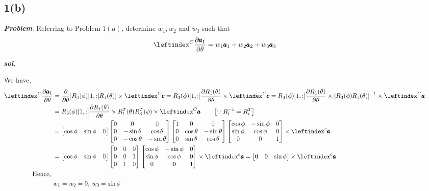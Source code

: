 \subsection{1(b)}
\textbf{\textit{Problem}}: Referring to Problem $1(a)$, determine $w_1, w_2$ and  $w_3$ such that
$$ \lx{^C}{\frac{\partial \pmb a_1}{\partial \theta}} = w_1 \pmb a_1 + w_2 \pmb a_2 + w_3 \pmb a_3$$

\textbf{\textit{sol.}}

We have,
\begin{align*}
    \lx{^C}{\frac{\partial \pmb a_1}{\partial \theta}}  &=
    \frac{\partial}{\partial \theta} [R_3(\phi)[1,:]R_1(\theta)] \times \lx{^C}{\pmb c}
    = R_3(\phi)[1,:] \frac{\partial R_1(\theta)}{\partial \theta} \times \lx{^C}{\pmb c}
    = R_3(\phi)[1,:] \frac{\partial R_1(\theta)}{\partial \theta} \times [R_3(\phi)R_1(\theta)]^{-1} \times \lx{^C}{\pmb a}\\
    &=R_3(\phi)[1,:] \frac{\partial R_1(\theta)}{\partial \theta} \times R_1^T(\theta) R_3^T(\phi)\times \lx{^C}{\pmb a}
    \qquad \left[ \because R_i^{-1} = R_i^T \right]\\
    &= \bm{\cos \phi & \sin \phi  & 0}
    \bm{
            0 & 0 & 0\\
            0 & -\sin \theta & \cos \theta\\
            0 & -\cos \theta & -\sin \theta
        }
    \bm{
            1 & 0 & 0\\
            0 & \cos \theta & -\sin \theta\\
            0 & \sin \theta & \cos \theta
    }
    \bm{
            \cos \phi & -\sin \phi  & 0\\
            \sin \phi & \cos \phi & 0\\
            0          & 0         & 1
        }
    \times \lx{^c}{\pmb a}\\
    &= \bm{\cos \phi & \sin \phi  & 0}
    \bm{
            0 & 0 & 0\\
            0 & 0 & 1\\
            0 & 1 & 0
        }
    \bm{
            \cos \phi & -\sin \phi  & 0\\
            \sin \phi & \cos \phi & 0\\
            0          & 0         & 1
        }
    \times \lx{^c}{\pmb a}
    = \bm{0 & 0 & \sin \phi} \times \lx{^c}{\pmb a}\\
    \text{Hence, }&\\
    & w_1 = w_2 = 0, \: w_3 = \sin \phi
\end{align*}
